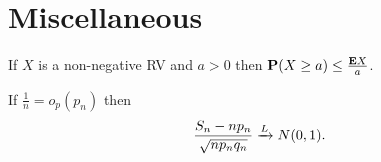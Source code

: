 \section{Miscellaneous}%
\label{sec:miscellaneous}

\begin{thm}
    If $X$ is a non-negative RV and $a > 0$ then $\mathbf{P}(X \ge a) \le \frac{\mathbf{E} X}{a}$.
\end{thm}


\begin{thm}[Binomial $p_n$]
    If $ \frac{1}{n} = o_p(p_n)$ then 
    \begin{equation*}
        \frac{S_n - n p_n}{\sqrt{n p_n q_n}} \xrightarrow{L} N(0, 1).
    \end{equation*}
\end{thm}
